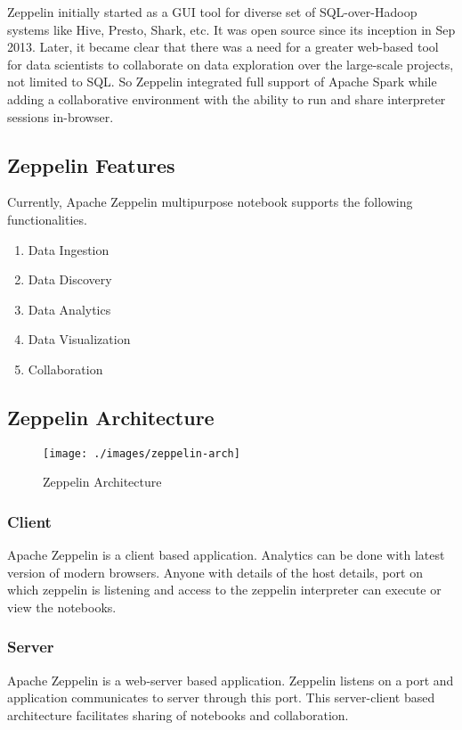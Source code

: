 \documentclass[9pt,twocolumn,twoside]{../../styles/osajnl}
\begin{document}
	Zeppelin initially started as a GUI tool for diverse set of 
	SQL-over-Hadoop systems like Hive, Presto, Shark, etc. It was 
	open 
	source since its inception in Sep 2013. Later, it became clear 
	that 
	there was a need for a greater web-based tool for data scientists 
	to 
	collaborate on data exploration over the large-scale projects, 
	not 
	limited to SQL. So Zeppelin integrated full support of Apache 
	Spark 
	while adding a collaborative environment with the ability to run 
	and 
	share interpreter sessions in-browser.
	
	\subsection{Zeppelin Features}
	
	Currently, Apache Zeppelin multipurpose notebook supports the 
	following functionalities.
	\begin{enumerate}
		\item Data Ingestion
		\item Data Discovery
		\item Data Analytics
		\item Data Visualization
		\item Collaboration
	\end{enumerate}
	
	\subsection{Zeppelin Architecture}
	
	\begin{figure}
		\texttt{[image: ./images/zeppelin-arch]}
		\caption{Zeppelin Architecture}
		\label{fig:Zeppelin Architecture}
	\end{figure}
	
	\subsubsection{Client}
	Apache Zeppelin is a client based application. Analytics can be 
	done with latest version of modern browsers. Anyone with details 
	of the host details, port on which zeppelin is listening and 
	access to the zeppelin interpreter can execute or view the 
	notebooks.
	
	\subsubsection{Server}
	Apache Zeppelin is a web-server based application. Zeppelin 
	listens on a port and application communicates to server through 
	this port. This server-client based architecture facilitates 
	sharing of notebooks and collaboration.  
	
\end{document}
